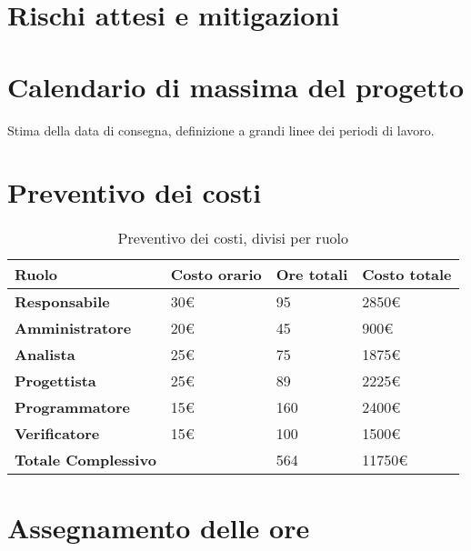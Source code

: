 \section{Rischi attesi e mitigazioni}

\section{Calendario di massima del progetto}

Stima della data di consegna, definizione a grandi linee dei periodi di lavoro.

\section{Preventivo dei costi}

\begin{table}[H]
	\renewcommand{\arraystretch}{1.5}
	\centering
	\begin{tabular}{l|l|l|l}
		\textbf{Ruolo} & \textbf{Costo orario} & \textbf{Ore totali} & \textbf{Costo totale} \\ \hline
		\toprule
		\textbf{Responsabile}		& 30€ & 95	& 2850€		\\
		\textbf{Amministratore} 	& 20€ & 45  & 900€		\\
		\textbf{Analista}			& 25€ & 75  & 1875€		\\
		\textbf{Progettista}		& 25€ & 89  & 2225€		\\
		\textbf{Programmatore}		& 15€ & 160 & 2400€		\\
		\textbf{Verificatore}		& 15€ & 100 & 1500€		\\
		\midrule
		\textbf{Totale Complessivo} &	  & 564 & 11750€	\\
	\end{tabular}
	\caption{Preventivo dei costi, divisi per ruolo}

\end{table}

\section{Assegnamento delle ore}

